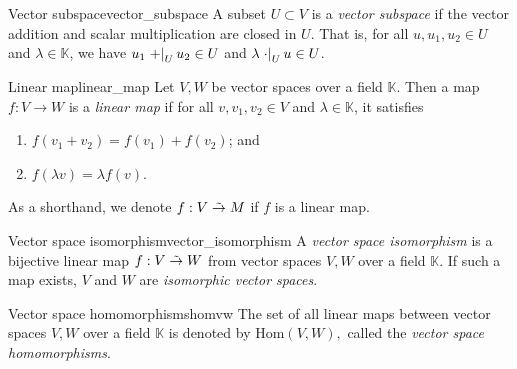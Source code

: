 \begin{definition}{Vector subspace}{vector_subspace}
    A subset \(U \subset V\) is a \emph{vector subspace} if the vector addition and scalar multiplication are closed in \(U\). That is, for all \(u, u_1, u_2 \in U\) and \(\lambda \in \mathbb{K}\), we have \(u_1 \left.+\right\rvert_{U} u_2 \in U\) and \(\lambda \left.\cdot\right\rvert_{U} u \in U\).
\end{definition}

\begin{definition}{Linear map}{linear_map}
    Let \(V, W\) be vector spaces over a field \(\mathbb{K}\). Then a map \(f : V \to W\) is a \emph{linear map} if for all \(v, v_1, v_2 \in V\) and \(\lambda\in \mathbb{K}\), it satisfies
    \begin{enumerate}[label=(\alph*)]
        \item \(f(v_1 + v_2) = f(v_1) + f(v_2)\); and
        \item \(f(\lambda v) = \lambda f(v)\).
    \end{enumerate}
    As a shorthand, we denote \(f : V \mathrel{\tilde{\to}} M\) if \(f\) is a linear map.
\end{definition}
\begin{definition}{Vector space isomorphism}{vector_isomorphism}
    A \emph{vector space isomorphism} is a bijective linear map \(f : V \mathrel{\tilde{\to}} W\) from vector spaces \(V, W\) over a field \(\mathbb{K}\). If such a map exists, \(V\) and \(W\) are \emph{isomorphic vector spaces}.
\end{definition}

\begin{definition}{Vector space homomorphisms}{homvw}
    The set of all linear maps between vector spaces \(V, W\) over a field \(\mathbb{K}\) is denoted by \(\mathrm{Hom}(V,W),\) called the \emph{vector space homomorphisms}.
\end{definition}

